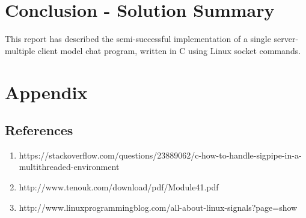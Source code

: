 \documentclass[titlepage, 14pt]{article}
\begin{document}
\section{Conclusion - Solution Summary}
This report has described the semi-successful implementation of a single server-multiple client model chat program, written in C using Linux socket commands.

\section{Appendix}

\subsection{References}
\begin{enumerate}
\item https://stackoverflow.com/questions/23889062/c-how-to-handle-sigpipe-in-a-multithreaded-environment
\item http://www.tenouk.com/download/pdf/Module41.pdf
\item http://www.linuxprogrammingblog.com/all-about-linux-signals?page=show
\end{enumerate}
\end{document}
